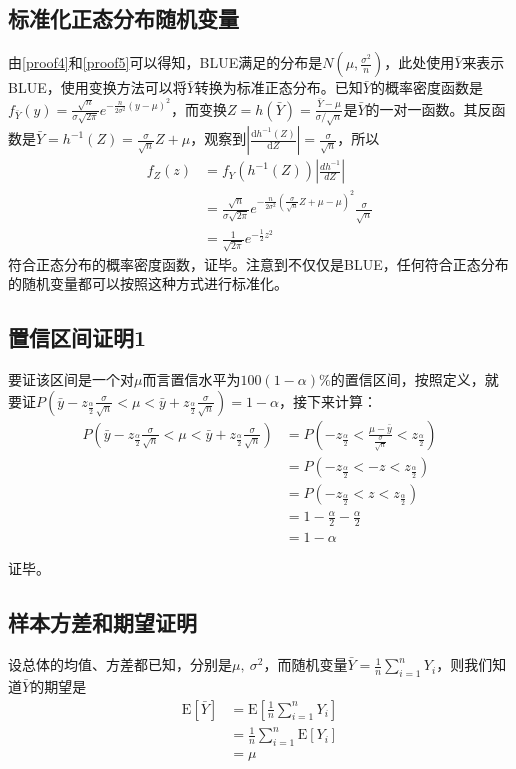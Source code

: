 \documentclass[UTF8]{ctexbook}
\begin{document}
\subsection{标准化正态分布随机变量}
\label{proof6}
由\ref{proof4}和\ref{proof5}可以得知，BLUE满足的分布是$N(\mu, \frac{\sigma^2}{n})$，此处使用$\bar Y$来表示BLUE，使用变换方法可以将$\bar Y$转换为标准正态分布。已知$\bar Y$的概率密度函数是$f_{\bar Y}(y)=\frac{\sqrt{n}}{\sigma\sqrt{2\pi}}e^{-\frac{n}{2\sigma^2}(y-\mu)^2}$，而变换$Z=h(\bar Y)=\frac{\bar Y-\mu}{\sigma/\sqrt{n}}$是$\bar Y$的一对一函数。其反函数是$\bar Y=h^{-1}(Z)=\frac{\sigma}{\sqrt n}Z+\mu$，观察到$\left|\frac{\mathrm dh^{-1}(Z)}{\mathrm dZ}\right|=\frac{\sigma}{\sqrt n}$，所以
\begin{align*}
	f_Z(z)&=f_Y(h^{-1}(Z))\left|\frac{dh^{-1}}{dZ}\right|\\
	&=\frac{\sqrt{n}}{\sigma\sqrt{2\pi}}e^{-\frac{n}{2\sigma^2}(\frac{\sigma}{\sqrt n}Z+\mu-\mu)^2}\frac{\sigma}{\sqrt n}\\
	&=\frac{1}{\sqrt{2\pi}}e^{-\frac{1}{2}z^2}
\end{align*}
符合正态分布的概率密度函数，证毕。注意到不仅仅是BLUE，任何符合正态分布的随机变量都可以按照这种方式进行标准化。
\subsection{置信区间证明1}
\label{proof7}
要证该区间是一个对$\mu$而言置信水平为$100(1-\alpha)\%$的置信区间，按照定义，就要证$P(\bar y-z_{\frac{\alpha}{2}}\frac{\sigma}{\sqrt n}<\mu<\bar y+z_{\frac{\alpha}{2}}\frac{\sigma}{\sqrt n})=1-\alpha$，接下来计算：
\begin{align*}
	P(\bar y-z_{\frac{\alpha}{2}}\frac{\sigma}{\sqrt n}<\mu<\bar y+z_{\frac{\alpha}{2}}\frac{\sigma}{\sqrt n})&=P(-z_\frac{\alpha}{2}<\frac{\mu-\bar y}{\frac{\sigma}{\sqrt n}}<z_\frac{\alpha}{2})\\
	&=P(-z_\frac{\alpha}{2}<-z<z_\frac{\alpha}{2})\\
	&=P(-z_\frac{\alpha}{2}<z<z_\frac{\alpha}{2})\\
	&=1-\frac{\alpha}{2}-\frac{\alpha}{2}\\
	&=1-\alpha
\end{align*}

证毕。

\subsection{样本方差和期望证明}
\label{proof8}
设总体的均值、方差都已知，分别是$\mu,\ \sigma^2$，而随机变量$\bar Y=\frac{1}{n}\sum_{i=1}^nY_i$，则我们知道$\bar Y$的期望是
\begin{align*}
	\mathrm E[\bar Y]&=\mathrm E[\frac{1}{n}\sum_{i=1}^nY_i]\\
	&=\frac{1}{n}\sum_{i=1}^n\mathrm E[Y_i]\\
	&=\mu
\end{align*}
\end{document}
